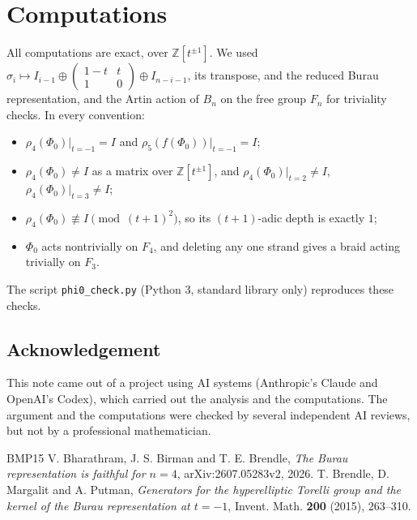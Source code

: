 \documentclass[11pt]{amsart}
\theoremstyle{remark}
\newcommand{\at}{\big|_{t=-1}}
\begin{document}
\appendix
\section{Computations}

All computations are exact, over $\mathbb{Z}[t^{\pm1}]$. We used $\sigma_i\mapsto I_{i-1}\oplus\begin{pmatrix}1-t&t\\1&0\end{pmatrix}\oplus I_{n-i-1}$, its transpose, and the reduced Burau representation, and the Artin action of $B_n$ on the free group $F_n$ for triviality checks. In every convention:
\begin{itemize}
\item $\rho_4(\Phi_0)\at=I$ and $\rho_5(f(\Phi_0))\at=I$;
\item $\rho_4(\Phi_0)\neq I$ as a matrix over $\mathbb{Z}[t^{\pm1}]$, and $\rho_4(\Phi_0)|_{t=2}\neq I$, $\rho_4(\Phi_0)|_{t=3}\neq I$;
\item $\rho_4(\Phi_0)\not\equiv I\pmod{(t+1)^2}$, so its $(t+1)$-adic depth is exactly $1$;
\item $\Phi_0$ acts nontrivially on $F_4$, and deleting any one strand gives a braid acting trivially on $F_3$.
\end{itemize}
The script \texttt{phi0\_check.py} (Python 3, standard library only) reproduces these checks.

\subsection*{Acknowledgement}
This note came out of a project using AI systems (Anthropic's Claude and OpenAI's Codex), which carried out the analysis and the computations. The argument and the computations were checked by several independent AI reviews, but not by a professional mathematician.

\begin{thebibliography}{BMP15}
 V. Bharathram, J. S. Birman and T. E. Brendle, \emph{The Burau representation is faithful for $n=4$}, arXiv:2607.05283v2, 2026.
 T. Brendle, D. Margalit and A. Putman, \emph{Generators for the hyperelliptic Torelli group and the kernel of the Burau representation at $t=-1$}, Invent. Math. \textbf{200} (2015), 263--310.
\end{thebibliography}
\end{document}
